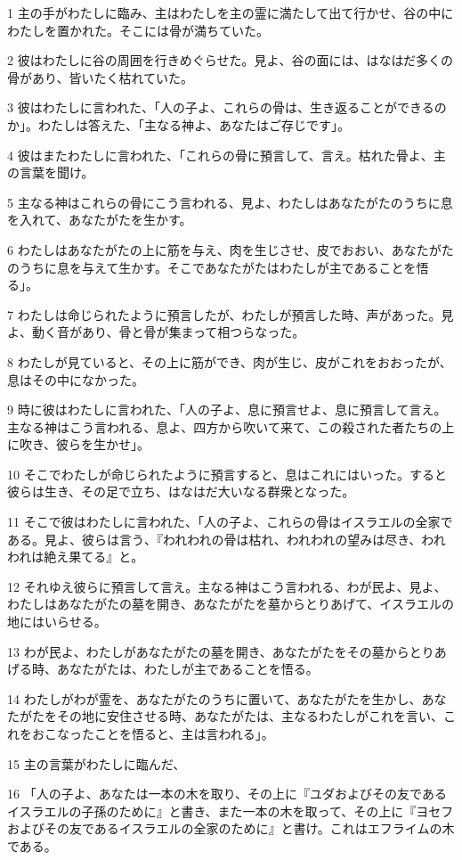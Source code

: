 \par 1 主の手がわたしに臨み、主はわたしを主の霊に満たして出て行かせ、谷の中にわたしを置かれた。そこには骨が満ちていた。
\par 2 彼はわたしに谷の周囲を行きめぐらせた。見よ、谷の面には、はなはだ多くの骨があり、皆いたく枯れていた。
\par 3 彼はわたしに言われた、「人の子よ、これらの骨は、生き返ることができるのか」。わたしは答えた、「主なる神よ、あなたはご存じです」。
\par 4 彼はまたわたしに言われた、「これらの骨に預言して、言え。枯れた骨よ、主の言葉を聞け。
\par 5 主なる神はこれらの骨にこう言われる、見よ、わたしはあなたがたのうちに息を入れて、あなたがたを生かす。
\par 6 わたしはあなたがたの上に筋を与え、肉を生じさせ、皮でおおい、あなたがたのうちに息を与えて生かす。そこであなたがたはわたしが主であることを悟る」。
\par 7 わたしは命じられたように預言したが、わたしが預言した時、声があった。見よ、動く音があり、骨と骨が集まって相つらなった。
\par 8 わたしが見ていると、その上に筋ができ、肉が生じ、皮がこれをおおったが、息はその中になかった。
\par 9 時に彼はわたしに言われた、「人の子よ、息に預言せよ、息に預言して言え。主なる神はこう言われる、息よ、四方から吹いて来て、この殺された者たちの上に吹き、彼らを生かせ」。
\par 10 そこでわたしが命じられたように預言すると、息はこれにはいった。すると彼らは生き、その足で立ち、はなはだ大いなる群衆となった。
\par 11 そこで彼はわたしに言われた、「人の子よ、これらの骨はイスラエルの全家である。見よ、彼らは言う、『われわれの骨は枯れ、われわれの望みは尽き、われわれは絶え果てる』と。
\par 12 それゆえ彼らに預言して言え。主なる神はこう言われる、わが民よ、見よ、わたしはあなたがたの墓を開き、あなたがたを墓からとりあげて、イスラエルの地にはいらせる。
\par 13 わが民よ、わたしがあなたがたの墓を開き、あなたがたをその墓からとりあげる時、あなたがたは、わたしが主であることを悟る。
\par 14 わたしがわが霊を、あなたがたのうちに置いて、あなたがたを生かし、あなたがたをその地に安住させる時、あなたがたは、主なるわたしがこれを言い、これをおこなったことを悟ると、主は言われる」。
\par 15 主の言葉がわたしに臨んだ、
\par 16 「人の子よ、あなたは一本の木を取り、その上に『ユダおよびその友であるイスラエルの子孫のために』と書き、また一本の木を取って、その上に『ヨセフおよびその友であるイスラエルの全家のために』と書け。これはエフライムの木である。
